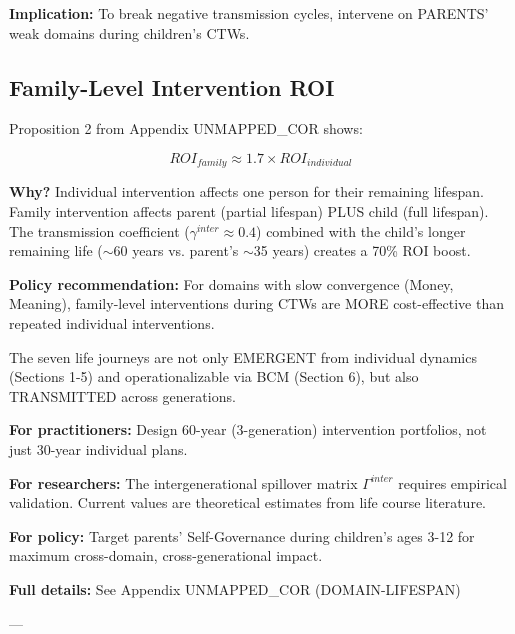{{{\textbf{Implication:} To break negative transmission cycles, intervene on PARENTS' weak domains during children's CTWs.

\subsection{Family-Level Intervention ROI}

Proposition 2 from Appendix UNMAPPED_COR shows:

\begin{equation}
ROI_{family} \approx 1.7 \times ROI_{individual}
\end{equation}

\textbf{Why?} Individual intervention affects one person for their remaining lifespan. Family intervention affects parent (partial lifespan) PLUS child (full lifespan). The transmission coefficient ($\gamma^{inter} \approx 0.4$) combined with the child's longer remaining life ($\sim$60 years vs. parent's $\sim$35 years) creates a 70\% ROI boost.

\textbf{Policy recommendation:} For domains with slow convergence (Money, Meaning), family-level interventions during CTWs are MORE cost-effective than repeated individual interventions.

\vspace{0.3cm}

\begin{tcolorbox}[colback=purple!5!white, colframe=purple!75!black, title=Key Takeaway: Life Journeys Are Inherited]

The seven life journeys are not only EMERGENT from individual dynamics (Sections 1-5) and operationalizable via BCM (Section 6), but also TRANSMITTED across generations.

\textbf{For practitioners:} Design 60-year (3-generation) intervention portfolios, not just 30-year individual plans.

\textbf{For researchers:} The intergenerational spillover matrix $\Gamma^{inter}$ requires empirical validation. Current values are theoretical estimates from life course literature.

\textbf{For policy:} Target parents' Self-Governance during children's ages 3-12 for maximum cross-domain, cross-generational impact.

\textbf{Full details:} See Appendix UNMAPPED_COR (DOMAIN-LIFESPAN)

\end{tcolorbox}

---

}}}
